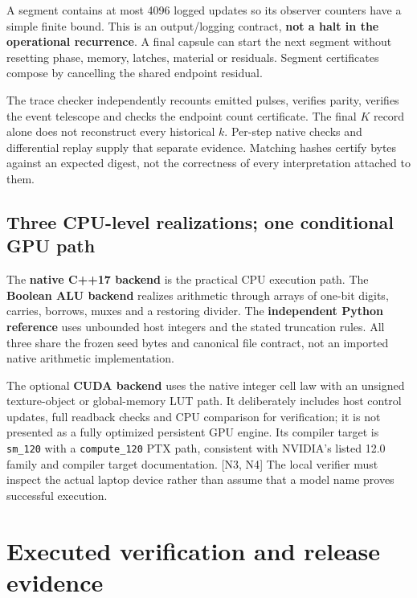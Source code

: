 \documentclass[11pt,a4paper]{article}
\begin{document}
A segment contains at most 4096 logged updates so its observer counters
have a simple finite bound. This is an output/logging contract,
\textbf{not a halt in the operational recurrence}. A final capsule can
start the next segment without resetting phase, memory, latches,
material or residuals. Segment certificates compose by cancelling the
shared endpoint residual.

The trace checker independently recounts emitted pulses, verifies
parity, verifies the event telescope and checks the endpoint count
certificate. The final \(K\) record alone does not reconstruct every
historical \(k\). Per-step native checks and differential replay supply
that separate evidence. Matching hashes certify bytes against an
expected digest, not the correctness of every interpretation attached to
them.

\subsection{Three CPU-level realizations; one conditional GPU
path}\label{three-cpu-level-realizations-one-conditional-gpu-path}

The \textbf{native C++17 backend} is the practical CPU execution path.
The \textbf{Boolean ALU backend} realizes arithmetic through arrays of
one-bit digits, carries, borrows, muxes and a restoring divider. The
\textbf{independent Python reference} uses unbounded host integers and
the stated truncation rules. All three share the frozen seed bytes and
canonical file contract, not an imported native arithmetic
implementation.

The optional \textbf{CUDA backend} uses the native integer cell law with
an unsigned texture-object or global-memory LUT path. It deliberately
includes host control updates, full readback checks and CPU comparison
for verification; it is not presented as a fully optimized persistent
GPU engine. Its compiler target is \texttt{sm\_120} with a
\texttt{compute\_120} PTX path, consistent with NVIDIA's listed 12.0
family and compiler target documentation. {[}N3, N4{]} The local
verifier must inspect the actual laptop device rather than assume that a
model name proves successful execution.

\section{Executed verification and release
evidence}\label{executed-verification-and-release-evidence}
\end{document}
